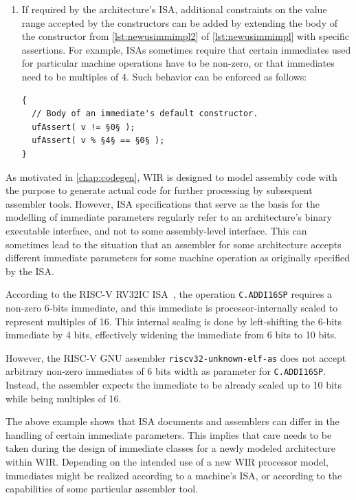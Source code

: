 \begin{enumerate}[resume]
\begin{lstlisting}[style=code,float=!t,caption={Implementation of a New Unsigned Immediate Parameter's Class},label=lst:newusimmimpl]
}       // namespace WIR
\end{lstlisting}

  \item If required by the architecture's \gls{ISA}, additional constraints on the value range accepted by the constructors can be added by extending the body of the constructor from \cref{lst:newusimmimpl2} of \cref{lst:newusimmimpl} with specific assertions.\label{enum:immconstr}
  For example, \glspl{ISA} sometimes require that certain immediates used for particular machine operations have to be non-zero, or that immediates need to be multiples of 4.
  Such behavior can be enforced as follows:
\begin{lstlisting}[style=code,float=!ht,xleftmargin=10mm,belowskip=-0.8 \baselineskip]
{
  // Body of an immediate's default constructor.
  ufAssert( v != §0§ );
  ufAssert( v % §4§ == §0§ );
}
\end{lstlisting}
\end{enumerate}

\clearpage
As motivated in \cref{chap:codegen}, \gls{WIR} is designed to model assembly code with the purpose to generate actual code for further processing by subsequent assembler tools.
However, \gls{ISA} specifications that serve as the basis for the modelling of immediate parameters regularly refer to an architecture's binary executable interface, and not to some assembly-level interface.
This can sometimes lead to the situation that an assembler for some architecture accepts different immediate parameters for some machine operation as originally specified by the \gls{ISA}.
\begin{wirExample}
According to  the RISC-V RV32IC \gls{ISA}~\cite{riscv17}, the operation \texttt{C.ADDI16SP} requires a non-zero 6-bits immediate, and this immediate is processor-internally scaled to represent multiples of 16.
This internal scaling is done by left-shifting the 6-bits immediate by 4 bits, effectively widening the immediate from 6 bits to 10 bits.

However, the RISC-V GNU assembler \texttt{riscv32-unknown-elf-as} does not accept arbitrary non-zero immediates of 6 bits width as parameter for \texttt{C.ADDI16SP}.
Instead, the assembler expects the immediate to be already scaled up to 10 bits while being multiples of 16.
\end{wirExample}
The above example shows that \gls{ISA} documents and assemblers can differ in the handling of certain immediate parameters.
This implies that care needs to be taken during the design of immediate classes for a newly modeled architecture within \gls{WIR}.
Depending on the intended use of a new \gls{WIR} processor model, immediates might be realized according to a machine's \gls{ISA}, or according to the capabilities of some particular assembler tool.

